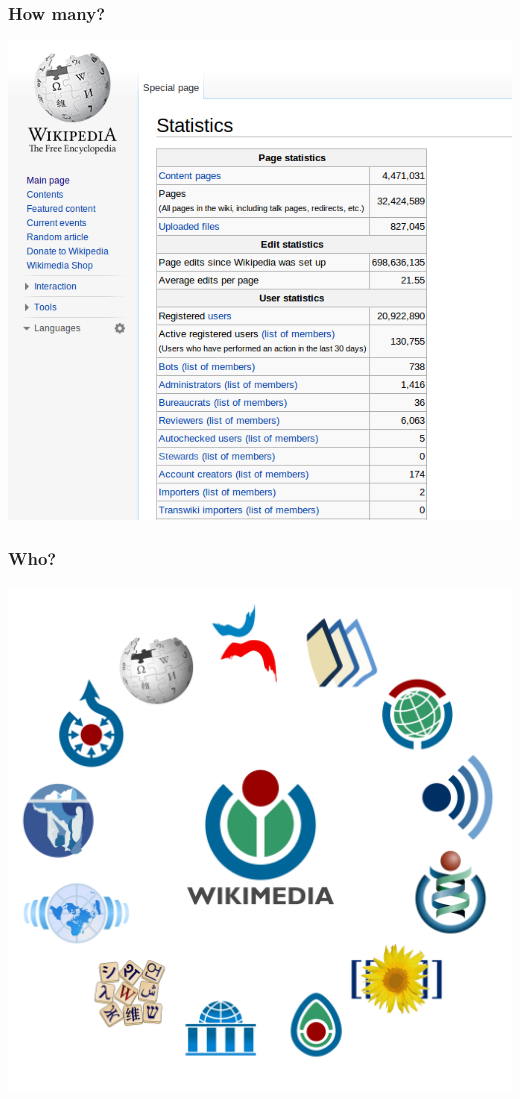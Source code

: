 \documentclass{beamer}
\begin{document}
\begin{frame}
  \frametitle{How many?}
  \begin{center}
    \includegraphics[height = 0.8\textheight, keepaspectratio = true]{figure/wiki_stats}
  \end{center}
\end{frame}

\begin{frame}
  \frametitle{Who?}
  \begin{center}
    \includegraphics[height = 0.8\textheight, keepaspectratio = true]{figure/wiki_family}
  \end{center}
\end{frame}
\end{document}
